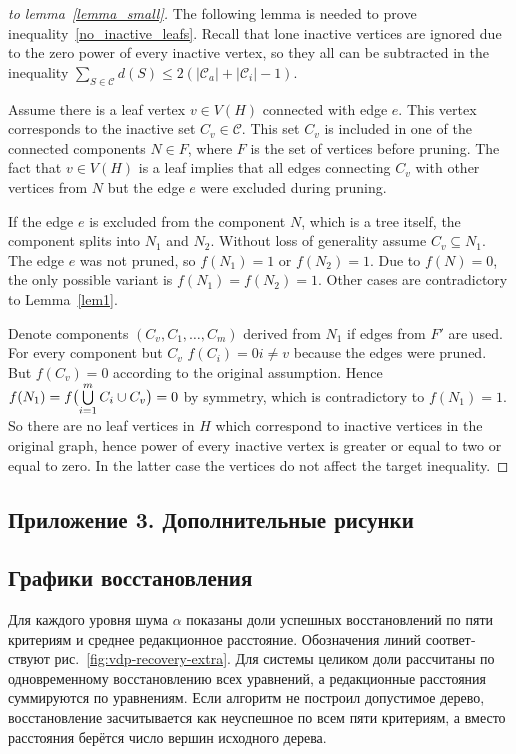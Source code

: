 \documentclass[12pt]{article}
\newif\ifhighlight \highlighttrue
\newenvironment{ru}{\begin{otherlanguage}{russian}\ifhighlight\color{blue}\fi}{\end{otherlanguage}}
\newtheorem{proof}{Proof}
\begin{document}
\begin{proof}[to lemma~\ref{lemma_small}]
		The following lemma is needed to prove inequality~\eqref{no_inactive_leafs}.
         Recall that lone inactive vertices are ignored due to the zero power of every inactive vertex, so they all can be subtracted in the inequality $\sum_{S\in\mathcal{C}}d(S) \leqslant 2(|\mathcal{C}_a| + |\mathcal{C}_i| -1)$.

         Assume there is a leaf vertex $v\in V(H)$ connected with edge $e$. This vertex corresponds to the inactive set $C_v\in\mathcal{C}$. This set $C_v$ is included in one of the connected components $N\in F$, where $F$ is the set of vertices before pruning. The fact that $v \in V(H)$ is a leaf implies that all edges connecting $C_v$ with other vertices from $N$ but the edge $e$ were excluded during pruning.

         If the edge $e$ is excluded from the component $N$, which is a tree itself, the component splits into $N_1$ and $N_2$. Without loss of generality assume $C_v\subseteq N_1$. The edge $e$ was not pruned, so $f(N_1)=1$ or $f(N_2)=1$. Due to $f(N) = 0$, the only possible variant is $f(N_1) = f(N_2) = 1$. Other cases are contradictory to Lemma~\ref{lem1}.

         Denote components $(C_v,C_1,\ldots,C_m)$ derived from $N_1$ if edges from $F'$ are used. For every component but $C_v$ $f(C_i)=0  i \neq v$ because the edges were pruned. But $f(C_v)=0$ according to the original assumption. Hence $f(N_1) = f\bigl(\bigcup\limits_{i=1}^{m} C_i \cup C_v\bigr) = 0$ by symmetry, which is contradictory to $f(N_1) = 1$. So there are no leaf vertices in $H$ which correspond to inactive vertices in the original graph, hence power of every inactive vertex is greater or equal to two or equal to zero. In the latter case the vertices do not affect the target inequality.
    \end{proof}

\clearpage
\begin{ru}
\section*{Приложение 3. Дополнительные рисунки}
{}

\subsection*{Графики восстановления}
Для каждого уровня шума $\alpha$ показаны доли успешных восстановлений по пяти критериям и среднее редакционное расстояние. Обозначения линий соответствуют рис.~\ref{fig:vdp-recovery-extra}. Для системы целиком доли рассчитаны по одновременному восстановлению всех уравнений, а редакционные расстояния суммируются по уравнениям. Если алгоритм не построил допустимое дерево, восстановление засчитывается как неуспешное по всем пяти критериям, а вместо расстояния берётся число вершин исходного дерева.
\end{ru}
\end{document}
